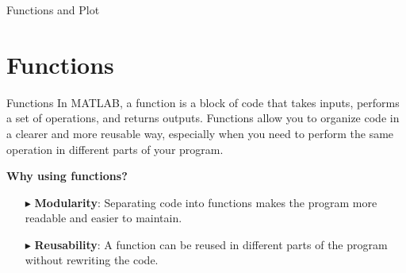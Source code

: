 \documentclass[xcolor={dvipsnames,rgb}, aspectratio=169]{beamer}
\begin{document}
{%
\begin{frame}[standout]
    Functions and Plot
\end{frame}
}

\section{Functions}
\begin{frame}{Functions}
    In MATLAB, a \alert{function} is a block of code that takes inputs, performs a set of
    operations, and returns outputs. Functions allow you to organize code in a clearer
    and more reusable way, especially when you need to perform the same operation in
    different parts of your program.

    \textbf{Why using functions?}
    \begin{itemize}
        \item[$\blacktriangleright$] \textbf{Modularity}: Separating code into functions
              makes the program more readable and easier to maintain.
        \item[$\blacktriangleright$] \textbf{Reusability}: A function can be reused in different
              parts of the program without rewriting the code.
    \end{itemize}
\end{frame}
\end{document}
